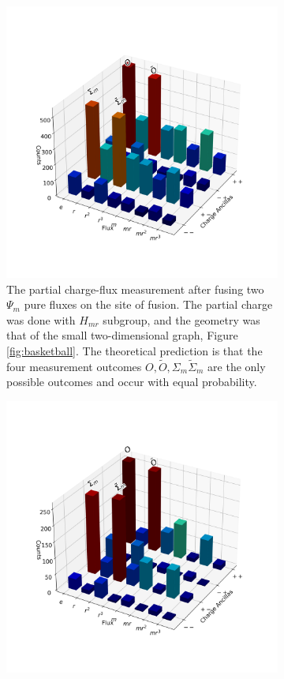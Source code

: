 \documentclass[two column]{article}
\begin{document}
\begin{figure}
\begin{subfigure}{0.47\textwidth}
    \includegraphics[width=\linewidth]{Figures/fusion_on_basketball.png}
    \caption{The partial charge-flux measurement after fusing two $\Psi_m$ pure fluxes on the site of fusion. The partial charge was done with $H_{mr}$ subgroup, and the geometry was that of the small two-dimensional graph, Figure \ref{fig:basketball}. The theoretical prediction is that the four measurement outcomes $O,\tilde O,\Sigma_m \tilde{\Sigma}_m$ are the only possible outcomes and occur with equal probability.}
    \label{fig:fusion_basketball}
\end{subfigure}
\vspace{15pt}
\begin{subfigure}{0.47\textwidth}
    \includegraphics[width=\linewidth]{Figures/braid_fusion.png}

\end{subfigure}
\end{figure}
\end{document}
